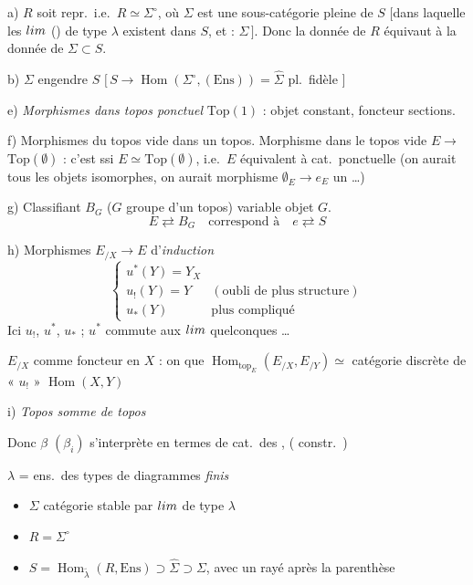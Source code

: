 \documentclass[11pt,a4paper]{article}
\begin{document}
a) $R$ soit  repr.\ i.e.\ $R \simeq \Sigma^{\circ}$, où
$\Sigma$ est une sous-catégorie pleine de $S$ $[$dans laquelle les
$\varinjlim$ () de type $\lambda$ existent dans $S$, et
\ill{} : $\Sigma\,]$. Donc la donnée de $R$ équivaut à la donnée de
$\Sigma \subset S$.

b) $\Sigma$ engendre $S$ $[\, S \to \operatorname{Hom}(\Sigma^{\circ},
(\mathrm{Ens})) = \widehat{\Sigma}$ pl.\ fidèle $]$

e) \emph{Morphismes dans topos ponctuel} $\mathrm{Top}(1)$ : objet
constant, foncteur sections.

f) Morphismes du topos vide dans un topos. Morphisme dans le topos vide
$E \to$  $\mathrm{Top}(\emptyset)$ : c'est ssi
$E \simeq \mathrm{Top}(\emptyset)$, i.e.\ $E$ équivalent à cat.\ ponctuelle (on
aurait tous les objets isomorphes, on aurait \ill{} morphisme
$\emptyset_{E} \to e_{E}$ un \ill{} \ldots)

g) Classifiant $B_{G}$ ($G$ groupe d'un topos) \ill{} variable \ill{} objet $G$.
\[
E \rightleftarrows B_{G} \quad \text{correspond à} \quad e \rightleftarrows S
\]

h) Morphismes $E_{/X} \longrightarrow E$ d'\emph{induction}
\[
\begin{cases}
u^{*}(Y) = Y_{X} & \\
u_{!}(Y) = Y & (\text{oubli de plus structure}) \\
u_{*}(Y) & \text{plus compliqué}
\end{cases}
\]
Ici \struck{\ill{}} $u_{!}$, $u^{*}$, $u_{*}$ ; $u^{*}$ commute aux
$\varprojlim$ quelconques \ldots



$E_{/X}$ \struck{\ill{}} comme foncteur en $X$ : on \ill{} que
$\operatorname{Hom}_{\mathrm{top}_{E}}(E_{/X}, E_{/Y}) \simeq$ catégorie discrète
de « $u_{!}$ » $\operatorname{Hom}(X,Y)$

i) \emph{Topos somme de topos}

Donc $\beta$ $(\beta_{i})$ s'interprète en termes de cat.\ des \ill{},
( constr.\ \ill{})

$\lambda$ = ens.\ des types de diagrammes \emph{finis}

\begin{itemize}
\item $\Sigma$ catégorie stable par $\varprojlim$ de type $\lambda$
\item $R = \Sigma^{\circ}$
\item $S = \operatorname{Hom}_{\underrightarrow{\lambda}}(R, \mathrm{Ens})
\supset \widehat{\Sigma} \supset \Sigma$, avec un 
rayé après la parenthèse
\end{itemize}
\end{document}
